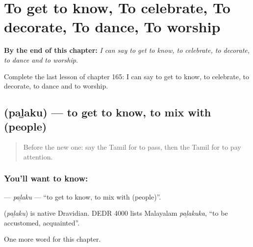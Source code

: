 
\chapter{To get to know, To celebrate, To decorate, To dance, To worship}
\label{ch:ta-to-get-to-know-to-celebrate-to-decorate-to-dance-to-worship}

\begin{chapteropening}
\textbf{By the end of this chapter:} \emph{I can say to get to know, to celebrate, to decorate, to dance and to worship.}

Complete the last lesson of chapter 165: I can say to get to know, to celebrate, to decorate, to dance and to worship.
\end{chapteropening}

\section[\texorpdfstring{\ta{பழகு} (paḻaku)}{பழகு (paḻaku)}]{ (paḻaku) — to get to know, to mix with (people)}

\label{lesson:TA-C165-palaku}



\begin{quote}
Before the new one: say the Tamil for to pass, then the Tamil for to pay attention.
\end{quote}

\subsection*{You'll want to know: }
\textbf{} — \emph{paḻaku} — \textquotedblleft{}to get to know, to mix with (people)\textquotedblright{}.

\begin{cousinweb}
\textbf{} (\emph{paḻaku}) is native Dravidian. DEDR 4000 lists Malayalam \emph{paḻakuka}, \textquotedblleft{}to be accustomed, acquainted\textquotedblright{}.
\end{cousinweb}

\begin{grammarlens}[title={What you've built}]
One more word for this chapter.
\end{grammarlens}

